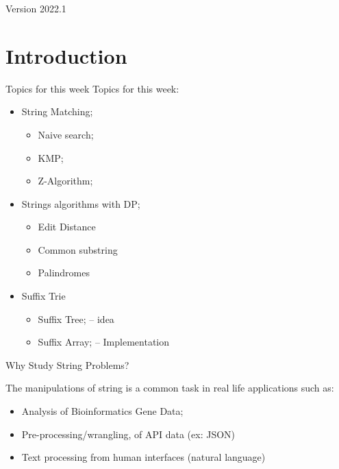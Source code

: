 \documentclass[aspectratio=169]{beamer}
\subtitle[Week 7: Strings]{Week 7 - String Problems}
\date[]{{\smaller(last updated: \today)}}
\begin{document}
\begin{CJK}{UTF8}{ipxm}

\begin{frame}
\maketitle
\vfill

\hfill Version 2022.1
\end{frame}

\section{Introduction}

\begin{frame}{Topics for this week}
  Topics for this week:
  \begin{itemize}
    \item String Matching;
    \begin{itemize}
      \item Naive search;
      \item KMP;
      \item Z-Algorithm;
    \end{itemize}
    \item Strings algorithms with DP;
    \begin{itemize}
      \item Edit Distance
      \item Common substring
      \item Palindromes
    \end{itemize}
    \item Suffix Trie
    \begin{itemize}
      \item Suffix Tree; -- idea
      \item Suffix Array; -- Implementation
    \end{itemize}
  \end{itemize}
\end{frame}

\begin{frame}{Why Study String Problems?}
    \begin{exampleblock}{}
      The manipulations of string is a common task in real life applications such as:

      \begin{itemize}
        \item Analysis of Bioinformatics Gene Data;
        \item Pre-processing/wrangling, of API data (ex: JSON)
        \item Text processing from human interfaces (natural language)
      \end{itemize}
    \end{exampleblock}


\end{frame}
\end{CJK}
\end{document}
